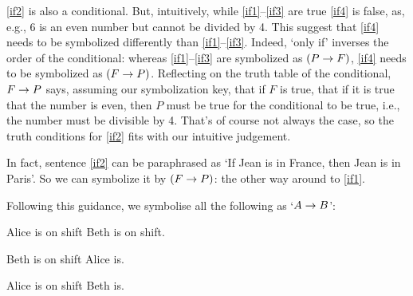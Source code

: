 \ref{if2} is also a conditional. But, intuitively, while \ref{if1}--\ref{if3} are true \ref{if4} is false, as, e.g., 6 is an even number but cannot be divided by 4. This suggest that \ref{if4} needs to be symbolized differently than \ref{if1}--\ref{if3}. Indeed, `only if' inverses the order of the conditional: whereas \ref{if1}--\ref{if3} are symbolized as $(P\rightarrow F)$, \ref{if4} needs to be symbolized as $(F\rightarrow P)$. Reflecting on the truth table of the conditional, $F\rightarrow P$ says, assuming our symbolization key, that if $F$ is true, that if it is true that the number is even, then $P$ must be true for the conditional to be true, i.e., the number must be divisible by 4. That's of course not always the case, so the truth conditions for \ref{if2} fits with our intuitive judgement.


In fact, sentence \ref{if2} can be paraphrased as `If Jean is in France, then Jean is in Paris'. So we can symbolize it by $(F \rightarrow P)$: the other way around to \ref{if1}.
	
	
	\noindent Following this guidance, we symbolise all the following as `$A\rightarrow B$':
	\begin{earg}
		\item[\ex{ifthen1}]  Alice is on shift  Beth is on shift.
		\item[\ex{ifthen2}]  Beth is on shift  Alice is.
		\item[\ex{ifthen3}]  Alice is on shift  Beth is.
	\end{earg}

